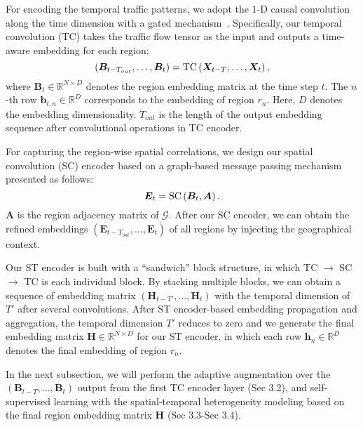 \documentclass[letterpaper]{article} \usepackage{aaai23}  \usepackage{times}  \usepackage{helvet}  \usepackage{courier}  \usepackage[hyphens]{url}  \usepackage{graphicx} \urlstyle{rm} \def\UrlFont{\rm}  \usepackage{natbib}  \usepackage{caption} \frenchspacing  \setlength{\pdfpagewidth}{8.5in} \setlength{\pdfpageheight}{11in}
\begin{document}
For encoding the temporal traffic patterns, we adopt the 1-D causal convolution along the time dimension with a gated mechanism~\cite{yu2018spatio}. Specifically, our temporal convolution (TC) takes the traffic flow tensor as the input and outputs a time-aware embedding for each region:
\begin{equation}\label{eq:tcl}\small
    \left(\bm{B}_{t-T_{out}}, \dots, \bm{B}_{t}\right) = \mathrm{TC}\left(\bm X_{t-T}, \dots, \bm X_{t}\right),
\end{equation}
\noindent where $\bm{B}_{t} \in \mathbb{R}^{N \times D}$ denotes the region embedding matrix at the time step $t$. The $n$-th row $\bm b_{t,n} \in \mathbb{R}^D$ corresponds to the embedding of region $r_n$. Here, $D$ denotes the embedding dimensionality. $T_{out}$ is the length of the output embedding sequence after convolutional operations in TC encoder.



For capturing the region-wise spatial correlations, we design our spatial convolution (SC) encoder based on a graph-based message passing mechanism presented as follows:
\begin{equation}\label{eq:scl}\small
    \bm{E}_t = \mathrm{SC}\left(\bm{B}_t, \bm A\right).
\end{equation}
\noindent $\bm A$ is the region adjacency matrix of $\mathcal{G}$. After our SC encoder, we can obtain the refined embeddings $\left(\bm{E}_{t-T_{out}}, \dots, \bm{E}_{t}\right)$ of all regions by injecting the geographical context.



Our ST encoder is built with a ``sandwich'' block structure, in which TC $\to$ SC $\to$ TC is each individual block. By stacking multiple blocks, we can obtain a sequence of embedding matrix $\left(\bm{H}_{t-T'}, \dots, \bm{H}_{t}\right)$ with the temporal dimension of $T'$ after several convolutions. After ST encoder-based embedding propagation and aggregation, the temporal dimension $T'$ reduces to zero and we generate the final embedding matrix $\bm H \in \mathbb{R}^{N \times D}$ for our ST encoder, in which each row $\bm h_n \in \mathbb{R}^D$ denotes the final embedding of region $r_n$. 

In the next subsection, we will perform the adaptive augmentation over the $\left(\bm{B}_{t-T}, \dots, \bm{B}_{t}\right)$ output from the first TC encoder layer (Sec 3.2), and self-supervised learning with the spatial-temporal heterogeneity modeling based on the final region embedding matrix $\bm H$ (Sec 3.3-Sec 3.4).
\end{document}
